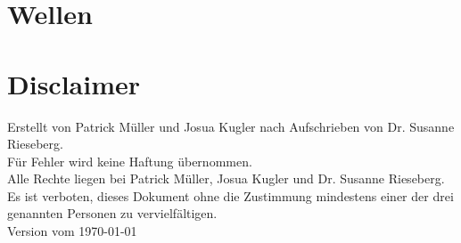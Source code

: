 \documentclass[12pt]{scrartcl}
\begin{document}
\begin{flushleft}
	\section{Wellen}	
	\section{Disclaimer}
	Erstellt von Patrick Müller und Josua Kugler nach Aufschrieben von Dr. Susanne Rieseberg. \\ Für Fehler wird keine Haftung übernommen. \\ Alle Rechte liegen bei Patrick Müller, Josua Kugler und Dr. Susanne Rieseberg. \\ Es ist verboten, dieses Dokument ohne die Zustimmung mindestens einer der drei genannten Personen zu vervielfältigen. \\
	Version vom \today
	
\end{flushleft} 
\end{document}
